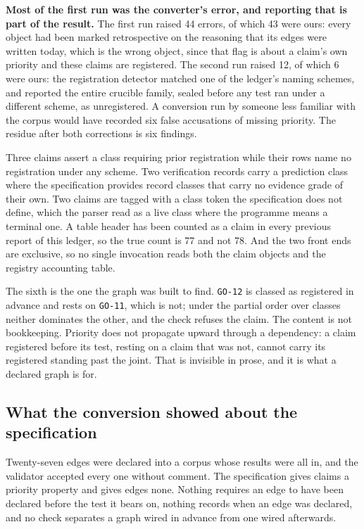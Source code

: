 \documentclass[journal]{IEEEtran}
\begin{document}
\textbf{Most of the first run was the converter's error, and reporting that is
part of the result.} The first run raised 44 errors, of which 43 were ours: every
object had been marked retrospective on the reasoning that its edges were written
today, which is the wrong object, since that flag is about a claim's own priority
and these claims are registered. The second run raised 12, of which 6 were ours:
the registration detector matched one of the ledger's naming schemes, and
reported the entire crucible family, sealed before any test ran under a different
scheme, as unregistered. A conversion run by someone less familiar with the
corpus would have recorded six false accusations of missing priority. The residue
after both corrections is six findings.

Three claims assert a class requiring prior registration while their rows name no
registration under any scheme. Two verification records carry a prediction class
where the specification provides record classes that carry no evidence grade of
their own. Two claims are tagged with a class token the specification does not
define, which the parser read as a live class where the programme means a
terminal one. A table header has been counted as a claim in every previous report
of this ledger, so the true count is 77 and not 78. And the two front ends are
exclusive, so no single invocation reads both the claim objects and the registry
accounting table.

The sixth is the one the graph was built to find. \texttt{GO-12} is classed as
registered in advance and rests on \texttt{GO-11}, which is not; under the
partial order over classes neither dominates the other, and the check refuses the
claim. The content is not bookkeeping. Priority does not propagate upward through
a dependency: a claim registered before its test, resting on a claim that was
not, cannot carry its registered standing past the joint. That is invisible in
prose, and it is what a declared graph is for.

\subsection{What the conversion showed about the specification}

Twenty-seven edges were declared into a corpus whose results were all in, and the
validator accepted every one without comment. The specification gives claims a
priority property and gives edges none. Nothing requires an edge to have been
declared before the test it bears on, nothing records when an edge was declared,
and no check separates a graph wired in advance from one wired afterwards.
\end{document}
